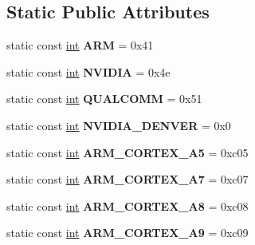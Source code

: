 \subsection*{Static Public Attributes}
\begin{DoxyCompactItemize}
\item 
\mbox{\label{classv8_1_1base_1_1CPU_a84a60a9c8739ef4ddcf39d2cccbba429}} 
static const \mbox{\hyperlink{classint}{int}} {\bfseries A\+RM} = 0x41
\item 
\mbox{\label{classv8_1_1base_1_1CPU_a904c908bf843365aec523725cf969620}} 
static const \mbox{\hyperlink{classint}{int}} {\bfseries N\+V\+I\+D\+IA} = 0x4e
\item 
\mbox{\label{classv8_1_1base_1_1CPU_a1adf680bac5c859060936507cf97af95}} 
static const \mbox{\hyperlink{classint}{int}} {\bfseries Q\+U\+A\+L\+C\+O\+MM} = 0x51
\item 
\mbox{\label{classv8_1_1base_1_1CPU_afee8892c349b397d405ecb6b2d3bf71e}} 
static const \mbox{\hyperlink{classint}{int}} {\bfseries N\+V\+I\+D\+I\+A\+\_\+\+D\+E\+N\+V\+ER} = 0x0
\item 
\mbox{\label{classv8_1_1base_1_1CPU_a3bf89e4327b692292af586fcbd6eb09f}} 
static const \mbox{\hyperlink{classint}{int}} {\bfseries A\+R\+M\+\_\+\+C\+O\+R\+T\+E\+X\+\_\+\+A5} = 0xc05
\item 
\mbox{\label{classv8_1_1base_1_1CPU_af2573b88c1699b13c4b22b601e112d78}} 
static const \mbox{\hyperlink{classint}{int}} {\bfseries A\+R\+M\+\_\+\+C\+O\+R\+T\+E\+X\+\_\+\+A7} = 0xc07
\item 
\mbox{\label{classv8_1_1base_1_1CPU_a9ed97a7d9550211dda1285f5f57f4fcf}} 
static const \mbox{\hyperlink{classint}{int}} {\bfseries A\+R\+M\+\_\+\+C\+O\+R\+T\+E\+X\+\_\+\+A8} = 0xc08
\item 
\mbox{\label{classv8_1_1base_1_1CPU_acc388963e336d95235eac735073cf948}} 
static const \mbox{\hyperlink{classint}{int}} {\bfseries A\+R\+M\+\_\+\+C\+O\+R\+T\+E\+X\+\_\+\+A9} = 0xc09
\item 

\end{DoxyCompactItemize}
